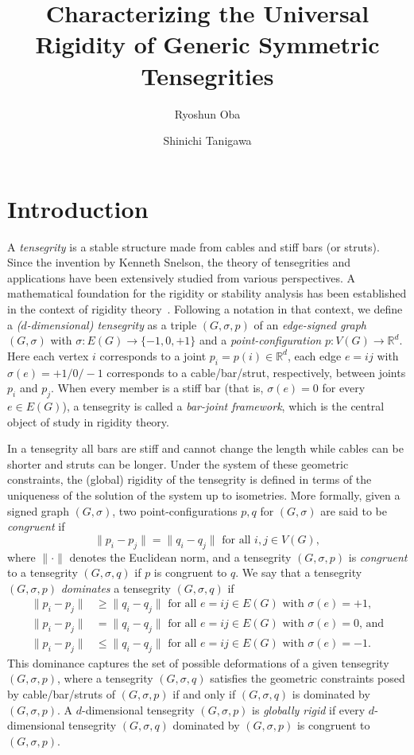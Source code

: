 \documentclass[11pt]{article}
\title{Characterizing the Universal Rigidity of Generic Symmetric Tensegrities}
\author{Ryoshun Oba \and Shinichi Tanigawa}
\theoremstyle{definition}
\begin{document}
\maketitle

\section{Introduction}
A {\em tensegrity} is a stable structure made from cables and stiff bars (or struts). 
Since the invention by Kenneth Snelson, the theory of tensegrities and applications have been extensively studied from various perspectives. 
A mathematical foundation for the rigidity or stability analysis has been established in the context of rigidity theory~\cite{RW81, CW95,connelly1982rigidity}.
Following a notation in that context, we define a {\em ($d$-dimensional)  tensegrity}  as a triple $(G, \sigma, p)$ of an {\em edge-signed graph} $(G,\sigma)$ with $\sigma:E(G)\rightarrow \{-1,0,+1\}$ and a {\em point-configuration} $p:V(G)\rightarrow \mathbb{R}^d$.
Here each vertex $i$ corresponds to a joint $p_i=p(i)\in \mathbb{R}^d$, 
each edge $e=ij$ with $\sigma(e)=+1/0/-1$ corresponds to a cable/bar/strut, respectively, between joints $p_i$ and  $p_j$.
When every member is a stiff bar (that is, $\sigma(e)=0$ for every $e\in E(G)$), a tensegrity is called a {\em bar-joint framework},
which is the central object of study in rigidity theory. 

In a tensegrity all bars are stiff and cannot change the length while cables can be shorter and struts can be longer.
Under the system of these geometric constraints, the (global) rigidity of the tensegrity is defined in terms of the uniqueness of the solution of the system  up to isometries. More formally, given a signed graph $(G,\sigma)$,  two point-configurations $p, q$ for $(G,\sigma)$ are said to be {\em  congruent} if 
\[
\|p_i -p_j\|=\|q_i -q_j\| \text{ for all } i, j \in V(G),
\]  
where $\|\cdot\|$ denotes the Euclidean norm, and a tensegrity  $(G,\sigma,p)$ is {\em congruent} to a tensegrity $(G,\sigma,q)$ if $p$ is congruent to $q$. 
We say that  a tensegrity  $(G,\sigma,p)$ {\em dominates} a tensegrity $(G,\sigma,q)$ 
if 
\begin{align*}
\|p_i -p_j\|&\geq \|q_i -q_j\| \text{ for all $e=ij \in E(G)$ with $\sigma(e)=+1$}, \\
\|p_i -p_j\|&= \|q_i -q_j\| \text{ for all $e=ij \in E(G)$ with $\sigma(e)=0$, and} \\ 
\|p_i -p_j\|&\leq \|q_i -q_j\| \text{ for all $e=ij \in E(G)$ with $\sigma(e)=-1$}.
\end{align*} 
This dominance captures the set of possible deformations of a given tensegrity $(G,\sigma, p)$, 
where a tensegrity $(G,\sigma,q)$ satisfies the geometric constraints posed by cable/bar/struts of $(G,\sigma, p)$ if and only if $(G,\sigma,q)$ is dominated by $(G,\sigma,p)$.
A $d$-dimensional tensegrity $(G,\sigma,p)$ is {\em globally rigid} if every $d$-dimensional tensegrity $(G,\sigma,q)$ dominated by $(G,\sigma,p)$ is congruent to $(G,\sigma,p)$.
\end{document}
